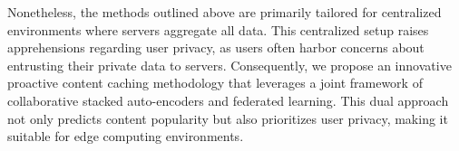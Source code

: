 Nonetheless, the methods outlined above are primarily tailored for centralized environments where servers aggregate all data. This centralized setup raises apprehensions regarding user privacy, as users often harbor concerns about entrusting their private data to servers. Consequently, we propose an innovative proactive content caching methodology that leverages a joint framework of collaborative stacked auto-encoders and federated learning. This dual approach not only predicts content popularity but also prioritizes user privacy, making it suitable for edge computing environments.